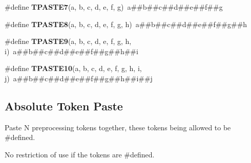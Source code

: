 \begin{DoxyCompactItemize}
\item 
\hypertarget{group__group__sam0__utils__tpaste_gad36c0d6224338a4f8738aa25659afc14}{}\#define {\bfseries T\+P\+A\+S\+T\+E7}(a,  b,  c,  d,  e,  f,  g)~a\#\#b\#\#c\#\#d\#\#e\#\#f\#\#g\label{group__group__sam0__utils__tpaste_gad36c0d6224338a4f8738aa25659afc14}

\item 
\hypertarget{group__group__sam0__utils__tpaste_gaf7aff743d5c0d66a81a13268b1a7e222}{}\#define {\bfseries T\+P\+A\+S\+T\+E8}(a,  b,  c,  d,  e,  f,  g,  h)~a\#\#b\#\#c\#\#d\#\#e\#\#f\#\#g\#\#h\label{group__group__sam0__utils__tpaste_gaf7aff743d5c0d66a81a13268b1a7e222}

\item 
\hypertarget{group__group__sam0__utils__tpaste_ga5440e5a665d859bec7c3527312d0889d}{}\#define {\bfseries T\+P\+A\+S\+T\+E9}(a,  b,  c,  d,  e,  f,  g,  h,  i)~a\#\#b\#\#c\#\#d\#\#e\#\#f\#\#g\#\#h\#\#i\label{group__group__sam0__utils__tpaste_ga5440e5a665d859bec7c3527312d0889d}

\item 
\hypertarget{group__group__sam0__utils__tpaste_ga0235b2e4ccf7a5b1d022a729a17a78a2}{}\#define {\bfseries T\+P\+A\+S\+T\+E10}(a,  b,  c,  d,  e,  f,  g,  h,  i,  j)~a\#\#b\#\#c\#\#d\#\#e\#\#f\#\#g\#\#h\#\#i\#\#j\label{group__group__sam0__utils__tpaste_ga0235b2e4ccf7a5b1d022a729a17a78a2}

\end{DoxyCompactItemize}
\subsection*{Absolute Token Paste}
\label{_amgrp61c59096cd4b7958303a985954baa7ca}%
Paste N preprocessing tokens together, these tokens being allowed to be \#defined.

No restriction of use if the tokens are \#defined.

